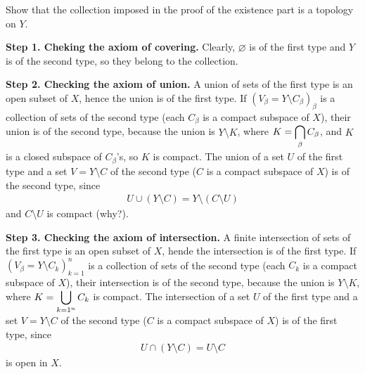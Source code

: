 \begin{prob}\label{check 1p cptf topology}
    Show that the collection imposed in the proof of the existence part is a topology on $Y$.
\end{prob}
\begin{sol}
    \textbf{Step 1. Cheking the axiom of covering.}\newline\noindent
    Clearly, $\varnothing$ is of the first type and $Y$ is of the second type, so they belong to the collection.

    \textbf{Step 2. Checking the axiom of union.}\newline\noindent
    A union of sets of the first type is an open subset of $X$, hence the union is of the first type.
    If $(V_\beta=Y\setminus C_\beta)_\beta$ is a collection of sets of the second type (each $C_\beta$ is a compact subspace of $X$), their union is of the second type, because the union is $Y\setminus K$, where $\displaystyle{K=\bigcap_\beta C_\beta}$, and $K$ is a closed subspace of $C_\beta$'s, so $K$ is compact.
    The union of a set $U$ of the first type and a set $V=Y\setminus C$ of the second type ($C$ is a compact subspace of $X$) is of the second type, since
    \begin{align*}
        U\cup (Y\setminus C)=Y\setminus (C\setminus U)
    \end{align*}
    and $C\setminus U$ is compact \color{brown}(why?)\color{black}.

    \textbf{Step 3. Checking the axiom of intersection.}\newline\noindent
    A finite intersection of sets of the first type is an open subset of $X$, hende the intersection is of the first type.
    If $(V_\beta=Y\setminus C_k)_{k=1}^n$ is a collection of sets of the second type (each $C_k$ is a compact subspace of $X$), their intersection is of the second type, because the union is $Y\setminus K$, where $\displaystyle{K=\bigcup_{k=1^n} C_k}$ is compact.
    The intersection of a set $U$ of the first type and a set $V=Y\setminus C$ of the second type ($C$ is a compact subspace of $X$) is of the first type, since
    \begin{align*}
        U\cap (Y\setminus C)=U\setminus C
    \end{align*}
    is open in $X$.
\end{sol}

